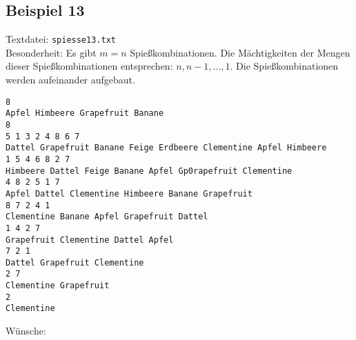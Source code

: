 \subsection{Beispiel 13}\label{example:13}
Textdatei: \texttt{spiesse13.txt}\\
Besonderheit: Es gibt $m = n$ Spießkombinationen. Die Mächtigkeiten der Mengen dieser Spießkombinationen entsprechen:
$n, n-1, ..., 1$. Die Spießkombinationen werden aufeinander aufgebaut.
\begin{verbatim}
8
Apfel Himbeere Grapefruit Banane
8
5 1 3 2 4 8 6 7 
Dattel Grapefruit Banane Feige Erdbeere Clementine Apfel Himbeere
1 5 4 6 8 2 7
Himbeere Dattel Feige Banane Apfel Gp0rapefruit Clementine
4 8 2 5 1 7 
Apfel Dattel Clementine Himbeere Banane Grapefruit
8 7 2 4 1
Clementine Banane Apfel Grapefruit Dattel
1 4 2 7
Grapefruit Clementine Dattel Apfel
7 2 1
Dattel Grapefruit Clementine
2 7
Clementine Grapefruit
2
Clementine
\end{verbatim}

\noindent
Wünsche: \\

\noindent
{}